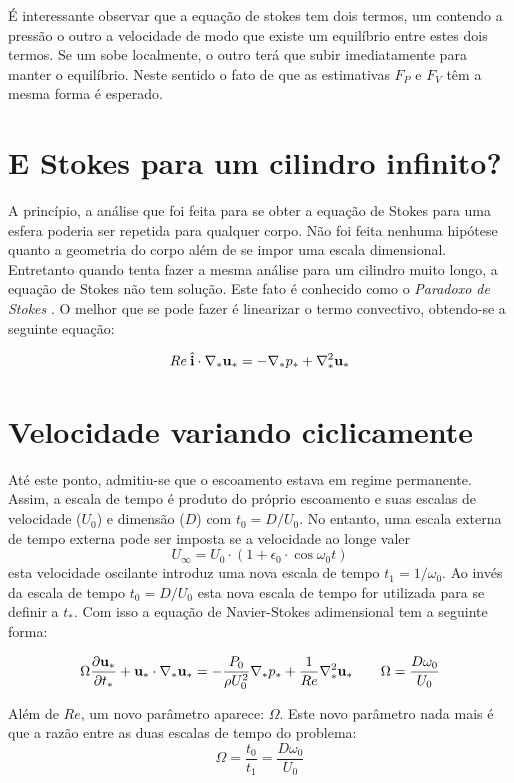 É interessante observar que a equação de stokes tem dois termos, um contendo a pressão o outro a velocidade de modo que existe um equilíbrio entre estes dois termos. Se um sobe localmente, o outro terá que subir imediatamente para manter o equilíbrio. Neste sentido o fato de que as estimativas $F_P$ e $F_V$ têm a mesma forma é esperado.

\section{E Stokes para um cilindro infinito?}
A princípio, a análise que foi feita para se obter a equação de Stokes para uma esfera poderia ser repetida para qualquer corpo. Não foi feita nenhuma hipótese quanto a geometria do corpo além de se impor uma escala dimensional. Entretanto quando tenta fazer a mesma análise para um cilindro muito longo, a equação de Stokes não tem solução. Este fato é conhecido como o \emph{Paradoxo de Stokes} \cite{Birkhoff60}. O melhor que se pode fazer é linearizar o termo convectivo, obtendo-se a seguinte equação:

\[
Re\:\hat{ \mathbf{i}}\cdot\nabla_* \mathbf{u_*} = -\nabla_* p_* + \nabla_*^2 \mathbf{u}_*
\]

\section{Velocidade variando ciclicamente}
Até este ponto, admitiu-se que o escoamento estava em regime permanente. Assim, a escala de tempo é produto do próprio escoamento e suas escalas de velocidade ($U_0$) e dimensão ($D$) com $t_0 = D/U_0$. No entanto, uma escala externa de tempo externa pode ser imposta se a velocidade ao longe valer
\[
U_\infty = U_0\cdot\left(1 + \epsilon_0\cdot\cos \omega_0 t\right)
\]
esta velocidade oscilante introduz uma nova escala de tempo $t_1 = 1/\omega_0$. Ao invés da escala de tempo $t_0 = D/U_0$ esta nova escala de tempo for utilizada para se definir a $t_*$. Com isso a equação de Navier-Stokes adimensional tem a seguinte forma:

\begin{equation}
\Omega\frac{\partial \mathbf{u}_*}{\partial t_*} +  \mathbf{u}_*\cdot\nabla_* \mathbf{u_*} = -\frac{P_0}{\rho U_0^2}\nabla_* p_* + \frac{1}{Re}\nabla_*^2 \mathbf{u}_*  \qquad \Omega = \frac{D\omega_0}{U_0}
\label{eq:nstemp}
\end{equation}

Além de $Re$, um novo parâmetro aparece: $\Omega$. Este novo parâmetro nada mais é que a razão entre as duas escalas de tempo do problema:
\[
\Omega = \frac{t_0}{t_1} = \frac{D\omega_0}{U_0}
\]

